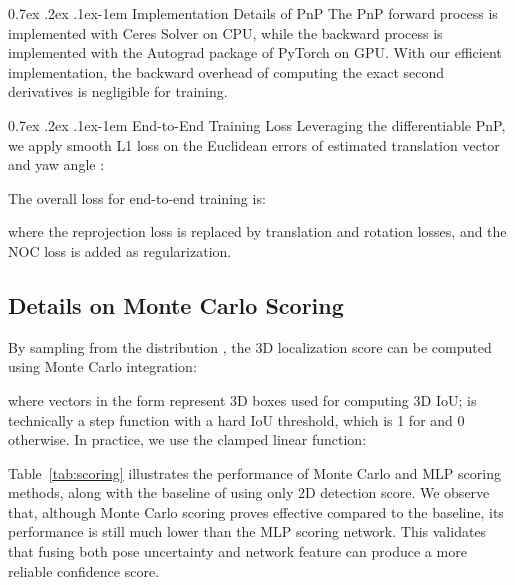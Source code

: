 \documentclass[10pt,twocolumn,letterpaper]{article}
\makeatletter
\renewcommand{\paragraph}{
  \@startsection{paragraph}{4}
  {\z@}{0.7ex \@plus .2ex \@minus .1ex}{-1em}
  {\normalfont\normalsize\bfseries}
}
\makeatother
\begin{document}
\paragraph{Implementation Details of PnP}
The PnP forward process is implemented with Ceres Solver on CPU, while the backward process is implemented with the Autograd package of PyTorch on GPU. With our efficient implementation, the backward overhead of computing the exact second derivatives is negligible for training.

\paragraph{End-to-End Training Loss}
Leveraging the differentiable PnP, we apply smooth L1 loss on the Euclidean errors of estimated translation vector  and yaw angle :


The overall loss for end-to-end training is:

where the reprojection loss is replaced by translation and rotation losses, and the NOC loss is added as regularization.

\subsection{Details on Monte Carlo Scoring}
By sampling  from the distribution , the 3D localization score can be computed using Monte Carlo integration:

where vectors in the form  represent 3D boxes used for computing 3D IoU;  is technically a step function with a hard IoU threshold, which is 1 for  and 0 otherwise. In practice, we use the clamped linear function:


Table~\ref{tab:scoring} illustrates the performance of Monte Carlo and MLP scoring methods, along with the baseline of using only 2D detection score. We observe that, although Monte Carlo scoring proves effective compared to the baseline, its performance is still much lower than the MLP scoring network. This validates that fusing both pose uncertainty and network feature can produce a more reliable confidence score.
\begin{table}[h]
    \begin{center}
    \end{center}
    \caption{Comparison between different scoring methods, based on the evaluation results on KITTI validation set.}
    \label{tab:scoring}
\end{table}
\end{document}
